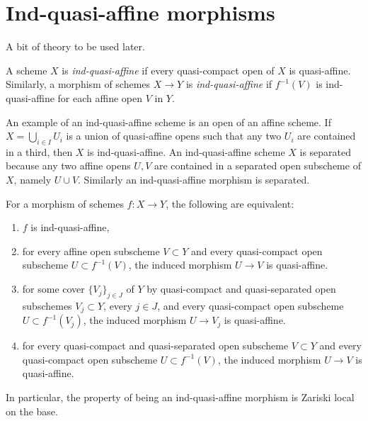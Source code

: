 \section{Ind-quasi-affine morphisms}
\label{section-ind-quasi-affine}

\noindent
A bit of theory to be used later.

\begin{definition}
\label{definition-ind-quasi-affine}
A scheme $X$ is {\it ind-quasi-affine} if every quasi-compact open of
$X$ is quasi-affine. Similarly, a morphism of schemes $X \to Y$
is {\it ind-quasi-affine} if $f^{-1}(V)$ is ind-quasi-affine
for each affine open $V$ in $Y$.
\end{definition}

\noindent
An example of an ind-quasi-affine scheme is an open of an affine scheme.
If $X = \bigcup_{i \in I} U_i$ is a union of quasi-affine opens such that
any two $U_i$ are contained in a third, then $X$ is ind-quasi-affine.
An ind-quasi-affine scheme $X$ is separated because any two affine
opens $U, V$ are contained in a separated open subscheme of $X$, namely
$U \cup V$. Similarly an ind-quasi-affine morphism is separated.

\begin{lemma}
\label{lemma-ind-quasi-affine-alternative-definition}
For a morphism of schemes $f : X \to Y$, the following are equivalent:
\begin{enumerate}
\item $f$ is ind-quasi-affine,
\item for every affine open subscheme $V \subset Y$ and
every quasi-compact open subscheme $U \subset f^{-1}(V)$,
the induced morphism $U \to V$ is quasi-affine. 
\item
for some cover $\{ V_j \}_{j \in J}$ of $Y$ by
quasi-compact and quasi-separated open subschemes
$V_j \subset Y$, every $j \in J$, and every quasi-compact
open subscheme $U \subset f^{-1}(V_j)$, the induced morphism
$U \to V_j$ is quasi-affine.
\item for every quasi-compact and quasi-separated open subscheme
$V \subset Y$ and every quasi-compact open subscheme
$U \subset f^{-1}(V)$, the induced morphism $U \to V$ is quasi-affine.
\end{enumerate}
In particular, the property of being an ind-quasi-affine morphism
is Zariski local on the base.
\end{lemma}

